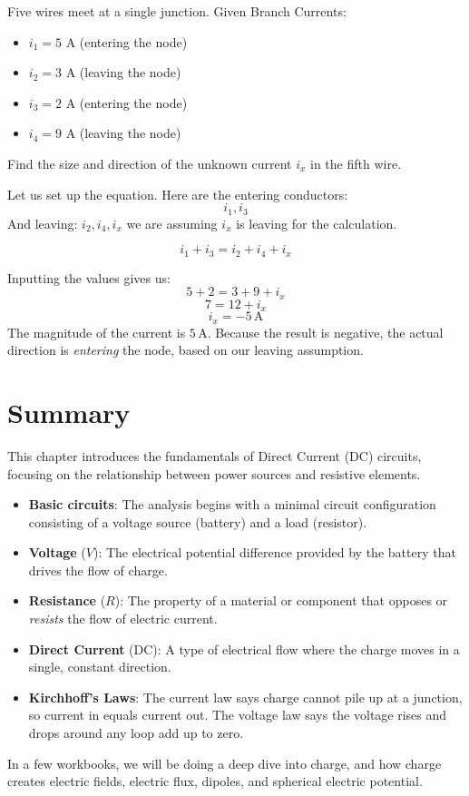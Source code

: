 \begin{Exercise}[title={Kirchhoff's Current Law}, label={ex:current_law}]
Five wires meet at a single junction.
Given Branch Currents:
\begin{itemize}
  \item $i_1 = 5\text{ A}$ (entering the node)
  \item $i_2 = 3\text{ A}$ (leaving the node)
  \item $i_3 = 2\text{ A}$ (entering the node)
  \item $i_4 = 9\text{ A}$ (leaving the node)
\end{itemize}

Find the size and direction of the unknown current $i_x$ in the fifth wire.
\end{Exercise}
\begin{Answer}[ref={ex:current_law}]
Let us set up the equation. Here are the entering conductors: $$i_1, i_3$$ And leaving: $i_2, i_4, i_x$ we are assuming $i_x$ is leaving for the calculation.

$$i_1 + i_3 = i_2 + i_4 + i_x$$

Inputting the values gives us:
$$5 + 2 = 3 + 9 + i_x$$
$$7 = 12 + i_x$$
$$i_x = -5 \, \textrm{A}$$
The magnitude of the current is $5 \, \textrm{A}$. Because the result is negative, the actual direction is \textit{entering} the node, based on our leaving assumption.
\end{Answer}
\section{Summary}
This chapter introduces the fundamentals of Direct Current (DC) circuits, focusing on the relationship between power sources and resistive elements.
\begin{itemize}
  \item \textbf{Basic circuits}: The analysis begins with a minimal circuit configuration consisting of a voltage source (battery) and a load (resistor).
  \item \textbf{Voltage} ($V$): The electrical potential difference provided by the battery that drives the flow of charge.
  \item \textbf{Resistance} ($R$): The property of a material or component that opposes or \textit{resists} the flow of electric current.
  \item \textbf{Direct Current} (DC): A type of electrical flow where the charge moves in a single, constant direction.
  \item \textbf{Kirchhoff's Laws}: The current law says charge cannot pile up at a junction, so current in equals current out. The voltage law says the voltage rises and drops around any loop add up to zero.
\end{itemize}

In a few workbooks, we will be doing a deep dive into charge, and how charge creates electric fields, electric flux, dipoles, and spherical electric potential. 